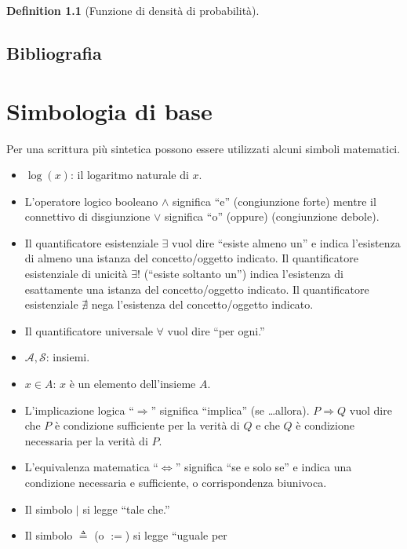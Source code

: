 \documentclass[
  letterpaper,
  DIV=11,
  numbers=noendperiod,
  oneside]{scrreprt}
\providecommand{\tightlist}{%
  \setlength{\itemsep}{0pt}\setlength{\parskip}{0pt}}
\theoremstyle{definition}
\theoremstyle{plain}
\theoremstyle{definition}
\newtheorem{definition}{Definition}[chapter]
\theoremstyle{remark}
\begin{document}
\begin{definition}[Funzione di densità di
probabilità]
\section*{Bibliografia}\label{bibliografia-11}


\cleardoublepage
{}
{}
\appendix

\chapter{Simbologia di base}\label{sec-apx-math-symbols}

Per una scrittura più sintetica possono essere utilizzati alcuni simboli
matematici.

\begin{itemize}
\tightlist
\item
  \(\log(x)\): il logaritmo naturale di \(x\).
\item
  L'operatore logico booleano \(\land\) significa ``e'' (congiunzione
  forte) mentre il connettivo di disgiunzione \(\lor\) significa ``o''
  (oppure) (congiunzione debole).
\item
  Il quantificatore esistenziale \(\exists\) vuol dire ``esiste almeno
  un'' e indica l'esistenza di almeno una istanza del concetto/oggetto
  indicato. Il quantificatore esistenziale di unicità \(\exists!\)
  (``esiste soltanto un'') indica l'esistenza di esattamente una istanza
  del concetto/oggetto indicato. Il quantificatore esistenziale
  \(\nexists\) nega l'esistenza del concetto/oggetto indicato.
\item
  Il quantificatore universale \(\forall\) vuol dire ``per ogni.''
\item
  \(\mathcal{A, S}\): insiemi.
\item
  \(x \in A\): \(x\) è un elemento dell'insieme \(A\).
\item
  L'implicazione logica ``\(\Rightarrow\)'' significa ``implica'' (se
  \ldots allora). \(P \Rightarrow Q\) vuol dire che \(P\) è condizione
  sufficiente per la verità di \(Q\) e che \(Q\) è condizione necessaria
  per la verità di \(P\).
\item
  L'equivalenza matematica ``\(\iff\)'' significa ``se e solo se'' e
  indica una condizione necessaria e sufficiente, o corrispondenza
  biunivoca.
\item
  Il simbolo \(\vert\) si legge ``tale che.''
\item
  Il simbolo \(\triangleq\) (o \(:=\)) si legge ``uguale per

\end{itemize}
\end{definition}
\end{document}
